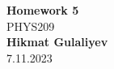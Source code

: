 \begin{titlepage}
    \begin{center}
    {\fontsize{40}{48}\selectfont \bfseries Homework 5} 
    \\\vspace{20pt}
    {\LARGE PHYS209} \\
    \vspace{20pt}
    \textbf{Hikmat Gulaliyev}
    \vspace{8pt}
    \\ 7.11.2023
    \end{center}
\end{titlepage}